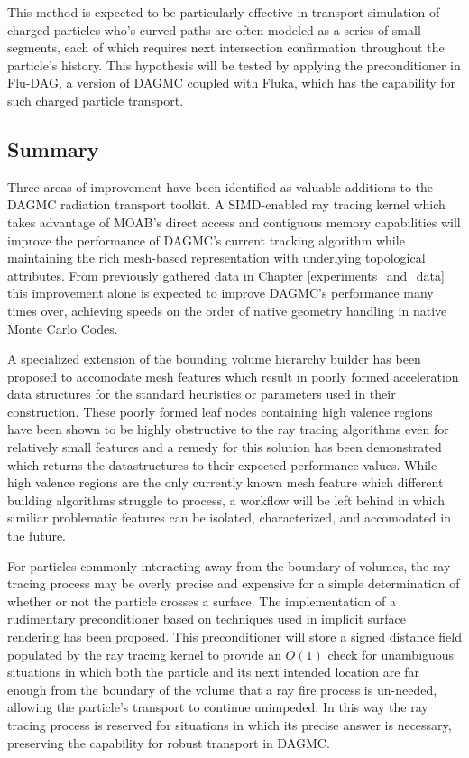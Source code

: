 \documentclass[12pt, a4paper]{article}
\begin{document}
This method is expected to be particularly effective in transport simulation of charged particles who's curved paths are often modeled as a series of small segments, each of which requires next intersection confirmation throughout the particle's history. This hypothesis will be tested by applying the preconditioner in Flu-DAG, a version of DAGMC coupled with Fluka\cite{Bohlen_2014}, which has the capability for such charged particle transport.


\subsection{Summary}

Three areas of improvement have been identified as valuable additions to the DAGMC radiation transport toolkit. A SIMD-enabled ray tracing kernel which takes advantage of MOAB's direct access and contiguous memory capabilities will improve the performance of DAGMC's current tracking algorithm while maintaining the rich mesh-based representation with underlying topological attributes. From previously gathered data in Chapter \ref{experiments_and_data} this improvement alone is expected to improve DAGMC's performance many times over, achieving speeds on the order of native geometry handling in native Monte Carlo Codes.

A specialized extension of the bounding volume hierarchy builder has been proposed to accomodate mesh features which result in poorly formed acceleration data structures for the standard heuristics or parameters used in their construction. These poorly formed leaf nodes containing high valence regions have been shown to be highly obstructive to the ray tracing algorithms even for relatively small features and a remedy for this solution has been demonstrated which returns the datastructures to their expected performance values. While high valence regions are the only currently known mesh feature which different building algorithms struggle to process, a workflow will be left behind in which similiar problematic features can be isolated, characterized, and accomodated in the future.

For particles commonly interacting away from the boundary of volumes, the ray tracing process may be overly precise and expensive for a simple determination of whether or not the particle crosses a surface. The implementation of a rudimentary preconditioner based on techniques used in implicit surface rendering has been proposed. This preconditioner will store a signed distance field populated by the ray tracing kernel to provide an $O(1)$ check for unambiguous situations in which both the particle and its next intended location are far enough from the boundary of the volume that a ray fire process is un-needed, allowing the particle's transport to continue unimpeded. In this way the ray tracing process is reserved for situations in which its precise answer is necessary, preserving the capability for robust transport in DAGMC.
\end{document}
